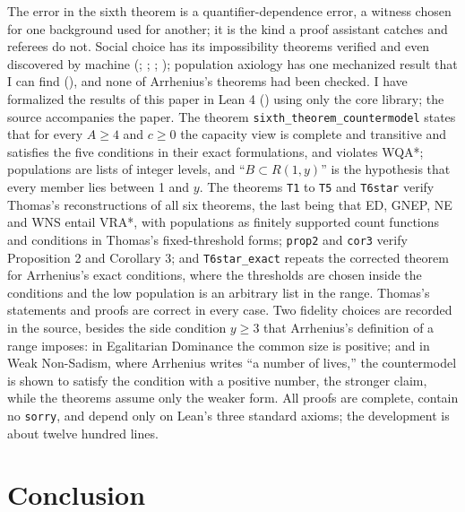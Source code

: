 \documentclass[
  11pt,
  letterpaper,
  DIV=11,
  numbers=noendperiod,
  twoside]{scrartcl}
\newcounter{none} %
\begin{document}
The error in the sixth theorem is a quantifier-dependence error, a
witness chosen for one background used for another; it is the kind a
proof assistant catches and referees do not. Social choice has its
impossibility theorems verified and even discovered by machine
(; ; ;
); population
axiology has one mechanized result that I can find
(), and
none of Arrhenius's theorems had been checked. I have formalized the
results of this paper in Lean 4 () using only the core library; the source accompanies
the paper. The theorem \texttt{sixth\_theorem\_countermodel} states that
for every \(A \geq 4\) and \(c \geq 0\) the capacity view is complete
and transitive and satisfies the five conditions in their exact
formulations, and violates WQA*; populations are lists of integer
levels, and ``\(B \subset R(1,y)\)'' is the hypothesis that every member
lies between 1 and \(y\). The theorems \texttt{T1} to \texttt{T5} and
\texttt{T6star} verify Thomas's reconstructions of all six theorems, the
last being that ED, GNEP, NE and WNS entail VRA*, with populations as
finitely supported count functions and conditions in Thomas's
fixed-threshold forms; \texttt{prop2} and \texttt{cor3} verify
Proposition 2 and Corollary 3; and \texttt{T6star\_exact} repeats the
corrected theorem for Arrhenius's exact conditions, where the thresholds
are chosen inside the conditions and the low population is an arbitrary
list in the range. Thomas's statements and proofs are correct in every
case. Two fidelity choices are recorded in the source, besides the side
condition \(y \geq 3\) that Arrhenius's definition of a range imposes:
in Egalitarian Dominance the common size is positive; and in Weak
Non-Sadism, where Arrhenius writes ``a number of lives,'' the
countermodel is shown to satisfy the condition with a positive number,
the stronger claim, while the theorems assume only the weaker form. All
proofs are complete, contain no \texttt{sorry}, and depend only on
Lean's three standard axioms; the development is about twelve hundred
lines.

\section{Conclusion}\label{sec-conclusion}
\end{document}
